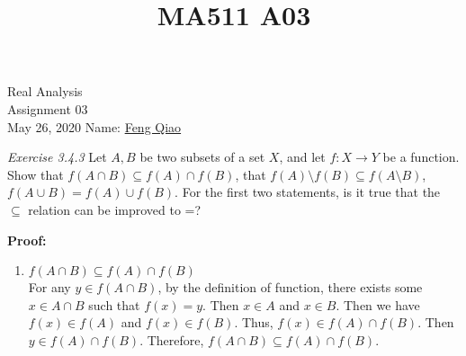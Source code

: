 \documentclass[12pt]{article}
\title{MA511 A03}
\newcommand{\ra}{\rightarrow}
\begin{document}
\begin{flushleft}
{\sc \Large Real Analysis} \\ 
\medskip
Assignment 03\\
May 26, 2020
\hfill Name: \underline{Feng Qiao} \\

\setdefaultleftmargin{0pt}{}{}{}{}{}

\textit{Exercise 3.4.3} Let \(A,B\) be two subsets of a set \(X\), and let \(f : X \ra Y\) be a function. Show that \(f(A \cap B) \subseteq f(A) \cap f(B)\), that \(f(A)\setminus f(B) \subseteq f(A\setminus B)\), \(f(A \cup B) = f(A) \cup f(B)\). For the first two statements, is it true that the \(\subseteq\) relation can be improved to =?

\end{flushleft}

\textbf{Proof:}
\renewcommand{\labelenumi}{\alph{enumi})}
\renewcommand{\labelenumii}{\arabic{enumii})}
\begin{enumerate}
    \item \(f(A \cap B) \subseteq f(A) \cap f(B)\)\\
    For any \(y \in f(A \cap B)\), by the definition of function, there exists some \(x \in A \cap B\) such that \(f(x) = y \).
    Then \(x \in A\) and \(x \in B\). Then we have \(f(x) \in f(A)\) and \(f(x) \in f(B)\). Thus, \(f(x) \in f(A) \cap f(B)\).
    Then \(y \in f(A) \cap f(B)\). Therefore, \(f(A \cap B) \subseteq f(A) \cap f(B)\).


\end{enumerate}
\end{document}
